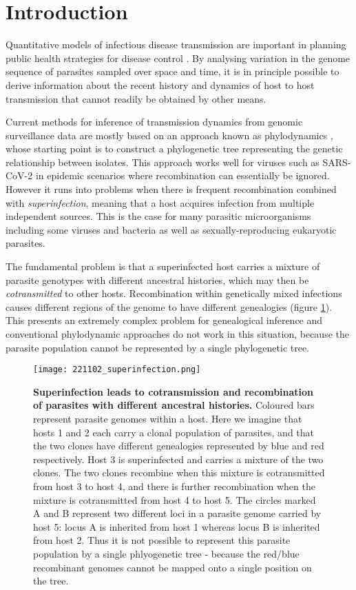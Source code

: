 \documentclass[_main.tex]{subfiles}
\begin{document}
\section*{Introduction}

Quantitative models of infectious disease transmission are important in planning public health strategies for disease control \cite{Ross1915,Smith2012}.  By analysing variation in the genome sequence of parasites sampled over space and time, it is in principle possible to derive information about the recent history and dynamics of host to host transmission that cannot readily be obtained by other means.

Current methods for inference of transmission dynamics from genomic surveillance data are mostly based on an approach known as phylodynamics \cite{Grenfell2004,Volz2013}, whose starting point is to construct a phylogenetic tree representing the genetic relationship between isolates.  This approach works well for viruses such as SARS-CoV-2 in epidemic scenarios where recombination can essentially be ignored.  However it runs into problems when there is frequent recombination combined with \textit{superinfection}, meaning that a host acquires infection from multiple independent sources.  This is the case for many parasitic microorganisms including some viruses and bacteria as well as sexually-reproducing eukaryotic parasites.

The fundamental problem is that a superinfected host carries a mixture of parasite genotypes with different ancestral histories, which may then be \textit{cotransmitted} to other hosts.  Recombination within genetically mixed infections causes different regions of the genome to have different genealogies (figure \ref{fig:superinfection1}).  This presents an extremely complex problem for genealogical inference  \cite{Speidel2019, Kelleher2019} and conventional phylodynamic approaches do not work in this situation, because the parasite population cannot be represented by a single phylogenetic tree.

\begin{figure}[ht]
\centering
\texttt{[image: 221102\_superinfection.png]}
\caption{\textbf{Superinfection leads to cotransmission and recombination of parasites with different ancestral histories.}  Coloured bars represent parasite genomes within a host.  Here we imagine that hosts 1 and 2 each carry a clonal population of parasites, and that the two clones have different genealogies represented by blue and red respectively.  Host 3 is superinfected and carries a mixture of the two clones.  The two clones recombine when this mixture is cotransmitted from host 3 to host 4, and there is further recombination when the mixture is cotransmitted from host 4 to host 5.  The circles marked A and B represent two different loci in a parasite genome carried by host 5: locus A is inherited from host 1 whereas locus B is inherited from host 2.  Thus it is not possible to represent this parasite population by a single phlyogenetic tree - because the red/blue recombinant genomes cannot be mapped onto a single position on the tree.}
\label{fig:superinfection1}
\end{figure}
\end{document}
